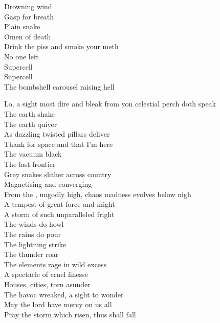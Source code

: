 Drowning wind \\
Gasp for breath \\
Plain snake \\
Omen of death \\
Drink the piss and smoke your meth \\
No one left \\

Supercell \\
Supercell \\
The bombshell carousel raising hell \\



Lo, a sight most dire and bleak from yon celestial perch doth speak \\
The earth shake \\
The earth quiver \\
As dazzling twisted pillars deliver \\

Thank  for space and that I'm here \\
The vacuum black \\
The last frontier \\
Grey snakes slither across country \\
Magnetising and converging \\

From the , ungodly high, chaos madness evolves below nigh \\
A tempest of great force and might \\
A storm of such unparalleled fright \\
The winds do howl \\
The rains do pour \\
The lightning strike \\
The thunder roar \\
The elements rage in wild excess \\
A spectacle of cruel finesse \\
Houses, cities, torn asunder \\
The havoc wreaked, a sight to wonder \\
May the lord have mercy on us all \\
Pray the storm which risen, thus shall fall \\


